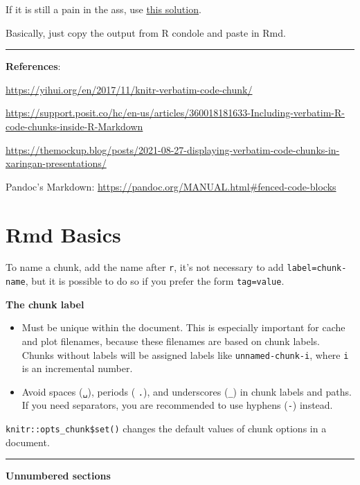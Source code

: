 \documentclass[
]{book}
\providecommand{\tightlist}{%
  \setlength{\itemsep}{0pt}\setlength{\parskip}{0pt}}
\theoremstyle{definition}
\theoremstyle{definition}
\theoremstyle{definition}
\theoremstyle{definition}
\theoremstyle{remark}
\begin{document}
If it is still a pain in the ass, use \href{https://tex.stackexchange.com/a/594904}{this solution}.

Basically, just copy the output from R condole and paste in Rmd.

\begin{center}\rule{0.5\linewidth}{0.5pt}\end{center}

\textbf{References}:

\url{https://yihui.org/en/2017/11/knitr-verbatim-code-chunk/}

\url{https://support.posit.co/hc/en-us/articles/360018181633-Including-verbatim-R-code-chunks-inside-R-Markdown}

\url{https://themockup.blog/posts/2021-08-27-displaying-verbatim-code-chunks-in-xaringan-presentations/}

Pandoc's Markdown: \url{https://pandoc.org/MANUAL.html\#fenced-code-blocks}

\section{Rmd Basics}\label{rmd-basics}

To name a chunk, add the name after \texttt{r}, it's not necessary to add \texttt{label=\textquotesingle{}chunk-name\textquotesingle{}}, but it is possible to do so if you prefer the form \texttt{tag=value}.

\textbf{The chunk label}

\begin{itemize}
\tightlist
\item
  Must be unique within the document. This is especially important for cache and plot filenames, because these filenames are based on chunk labels. Chunks without labels will be assigned labels like \texttt{unnamed-chunk-i}, where \texttt{i} is an incremental number.
\item
  Avoid spaces (\texttt{␣}), periods ( \texttt{.}), and underscores (\texttt{\_}) in chunk labels and paths. If you need separators, you are recommended to use hyphens (\texttt{-}) instead.
\end{itemize}

\texttt{knitr::opts\_chunk\$set()} changes the default values of chunk options in a document.

\begin{center}\rule{0.5\linewidth}{0.5pt}\end{center}

\textbf{Unnumbered sections}
\end{document}
